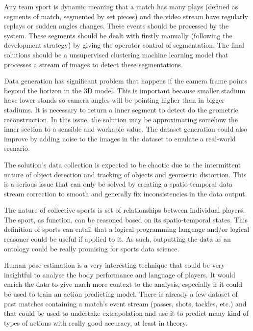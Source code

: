 \documentclass[
    11pt,
    oneside
]{report}
\begin{document}
Any team sport is dynamic meaning that a match has many plays (defined as segments of match, segmented by set pieces) and the video stream have regularly replays or sudden angles changes. These events should be processed by the system. These segments should be dealt with firstly manually (following the development strategy) by giving the operator control of segmentation. The final solutions should be a unsupervised clustering machine learning model that processes a stream of images to detect these segmentations.


Data generation has significant problem that happens if the camera frame points beyond the horizon in the 3D model. This is important because smaller stadium have lower stands so camera angles will be pointing higher than in bigger stadiums. It is necessary to return a inner segment to detect do the geometric reconstruction. In this issue, the solution may be approximating somehow the inner section to a sensible and workable value. The dataset generation could also improve by adding noise to the images in the dataset to emulate a real-world scenario.


The solution's data collection is expected to be chaotic due to the intermittent nature of object detection and tracking of objects and geometric distortion. This is a serious issue that can only be solved by creating a spatio-temporal data stream correction to smooth and generally fix inconsistencies in the data output.


The nature of collective sports is set of relationships between individual players. The sport, as function, can be reasoned based on its spatio-temporal states. This definition of sports can entail that a logical programming language and/or logical reasoner could be useful if applied to it. As such, outputting the data as an ontology could be really promising for sports data science.


Human pose estimation is a very interesting technique that could be very insightful to analyse the body performance and language of players. It would enrich the data to give much more context to the analysis, especially if it could be used to train an action predicting model. There is already a few dataset of past matches containing a match's event stream (passes, shots, tackles, etc.) and that could be used to undertake extrapolation and use it to predict many kind of types of actions with really good accuracy, at least in theory.
\end{document}
